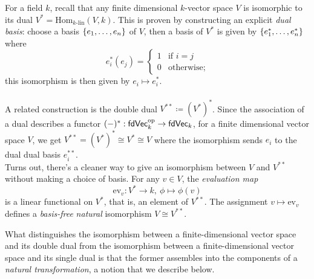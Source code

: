 \begin{example}\label{dualex}
For a field $k$, recall that any finite dimensional $k$-vector space $V$ is isomorphic to its dual $V^* = \mathrm{Hom}_{k\text{-lin}}(V,k)$. This is proven by constructing an explicit \emph{dual basis}: choose a basis $\left\{e_1,\ldots,e_n\right\}$ of $V$, then a basis of $V^*$ is given by $\left\{e_1^*,\ldots,e_n^*\right\}$ where
\[e_i^*(e_j) = \begin{cases} 1 & \text{if $i = j$}\\ 0 & \text{otherwise};\end{cases}\]
this isomorphism is then given by $e_i \mapsto e_i^*$.\\
\\
A related construction is the double dual $V^{**} \coloneqq (V^*)^*$. Since the association of a dual describes a functor $(-)^*:\mathsf{fdVec}_k^{\text{op}} \to \mathsf{fdVec}_k$, for a finite dimensional vector space $V$, we get $V^{**} = (V^*)^* \cong V^* \cong V$ where the isomorphism sends $e_i$ to the dual dual basis $e_i^{**}$.\\[0.5em]
Turns out, there's a cleaner way to give an isomorphism between $V$ and $V^{**}$ without making a choice of basis. For any $v \in V$, the \emph{evaluation map}
\[\mathrm{ev}_v:V^* \to k,\ \phi \mapsto \phi(v)\]
is a linear functional on $V^*$, that is, an element of $V^{**}$. The assignment $v \mapsto \mathrm{ev}_v$ defines a \emph{basis-free} \emph{natural} isomorphism $V \cong V^{**}$.
\end{example}


What distinguishes the isomorphism between a finite-dimensional vector space and its double dual from the isomorphism between a finite-dimensional vector space and its single dual is that the former assembles into the components of a \emph{natural transformation}, a notion that we describe below.

\vspace*{0.1in}

